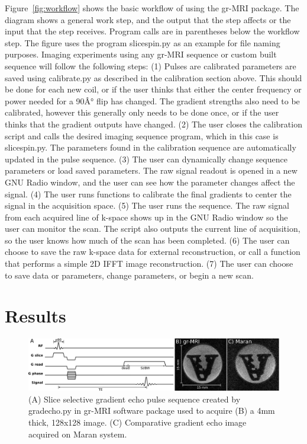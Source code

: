 \documentclass[review]{elsarticle}
\renewcommand{\textcolor}[1]{}
\begin{document}
\indent Figure~\ref{fig:workflow}  shows the basic workflow of using the gr-MRI package.  The diagram shows a general work step, and the output that the step affects or the input that the step receives.  Program calls are in parentheses below the workflow step.  The figure uses the program slicespin.py as an example for file naming purposes.  Imaging experiments using any gr-MRI sequence or custom built sequence will follow the following steps: (1) Pulses are calibrated parameters are saved using calibrate.py as described in the calibration section above.  This should be done for each new coil, or if the user thinks that either the center frequency or power needed for a 90Â° flip has changed.  The gradient strengths also need to be calibrated, however this generally only needs to be done once, or if the user thinks that the gradient outputs have changed. (2) The user closes the calibration script and calls the desired imaging sequence program, which in this case is slicespin.py.  The parameters found in the calibration sequence are automatically updated in the pulse sequence. (3) The user can dynamically change sequence parameters or load saved parameters.  The raw signal readout is opened in a new GNU Radio window, and the user can see how the parameter changes affect the signal. (4) The user runs functions to calibrate the final gradients to center the signal in the acquisition space.  (5) The user runs the sequence.  The raw signal from each acquired line of k-space shows up in the GNU Radio window so the user can monitor the scan.  The script also outputs the current line of acquisition, so the user knows how much of the scan has been completed.  (6) The user can choose to save the raw k-space data for external reconstruction, or call a function that performs a simple 2D IFFT image reconstruction.  (7) The user can choose to save data or parameters, change parameters, or begin a new scan.




\section{Results}

\begin{figure}[!ht]
\begin{center}
\includegraphics[width = 1\textwidth,trim=0 0 0 0,clip=false]{gre_results.png}
\caption{\textcolor{black}{(A) Slice selective gradient echo pulse sequence created by gradecho.py in gr-MRI software package used to acquire (B) a 4mm thick, 128x128 image. (C) Comparative gradient echo image acquired on Maran system.}}
\label{fig:gre_image}
\end{center}
\end{figure}
 
\end{document}
